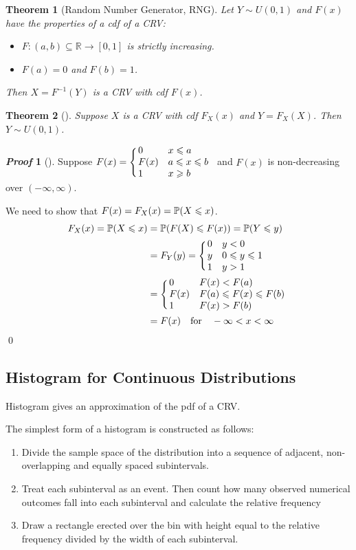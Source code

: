 \documentclass[10pt,UTF8]{article}
\makeatletter
\newenvironment{definition box}
{\begin{tcolorbox}[colback=blue!5!white,colframe=blue!75!black,parbox=false,before upper=\par,before lower=\par]}
{\end{tcolorbox}}
\newenvironment{theorem box}
{\begin{tcolorbox}[colback=yellow!5!white,colframe=yellow!75!black,parbox=false,before upper=\par,before lower=\par]}
{\end{tcolorbox}}
\theoremstyle{definition}
\newtheorem{definition inner}{Definition}[section]
\theoremstyle{plain}
\newtheorem{theorem inner}{Theorem}[section]
\newenvironment{theorem}[1][]
{\begin{theorem box}\begin{theorem inner}[#1]\hfill\par}
{\end{theorem inner}\end{theorem box}}
\theoremstyle{definition}
\newtheorem*{proof inner}{\textit{Proof}}
\renewenvironment{proof}[1][]
{\begin{proof inner}[#1]\hfill\par}
{\qed\end{proof inner}}
\theoremstyle{remark}
\newcommand{\mycases}[2][0.8]{
    \left\{\vphantom{\scalebox{#1}{
        $\begin{matrix}#2\end{matrix}$
    }}\right.\!\!\!\!
    \begin{array}{l@{\quad}l}#2\end{array}
}
\newcommand{\Prob}{\mathbb{P}\qty}
\makeatother
\begin{document}
\begin{theorem}[Random Number Generator, RNG]
    Let $Y\sim U(0,1)$ and $F(x)$ have the properties of a cdf of a CRV:
    \begin{itemize}
        \item $F\colon(a,b)\subseteq\mathbb{R}\to[0,1]$ is strictly increasing.
        \item $F(a)=0$ and $F(b)=1$.
    \end{itemize}
    Then $X=F^{-1}(Y)$ is a CRV with cdf $F(x)$.
\end{theorem}

\begin{theorem}
    Suppose $X$ is a CRV with cdf $F_X(x)$ and $Y=F_X(X)$.
    Then $Y\sim U(0,1)$.
\end{theorem}
\begin{proof}
    Suppose $F(x)=\mycases{
        0 & x \leqslant a \\
        F(x) & a \leqslant x \leqslant b \\
        1 & x \geqslant b
    }$ and $F(x)$ is non-decreasing over $(-\infty, \infty)$.
    
    We need to show that $F(x)=F_X(x)=\Prob(X\leqslant x)$.
    \begin{align*}
        F_X(x) = \Prob(X\leqslant x)
        &= \Prob(F(X)\leqslant F(x))
        = \Prob(Y\leqslant y) \\
        &= F_Y(y) = \mycases{
            0 & y < 0 \\
            y & 0 \leqslant y \leqslant 1 \\
            1 & y > 1
        } \\
        &= \mycases{
            0 & F(x) < F(a) \\
            F(x) & F(a) \leqslant F(x) \leqslant F(b) \\
            1 & F(x) > F(b)
        } \\
        &= F(x) \qfor -\infty < x < \infty
    \end{align*}
\end{proof}

\subsection{Histogram for Continuous Distributions}

Histogram gives an approximation of the pdf of a CRV.

The simplest form of a histogram is constructed as follows:
\begin{enumerate}
    \item Divide the sample space of the distribution into a
    sequence of adjacent, non-overlapping and equally spaced subintervals.
    \item Treat each subinterval as an event. Then count how many
    observed numerical outcomes fall into each subinterval and
    calculate the relative frequency
    \item Draw a rectangle erected over the bin with height equal to the
    relative frequency divided by the width of each subinterval.
\end{enumerate}
\end{document}
